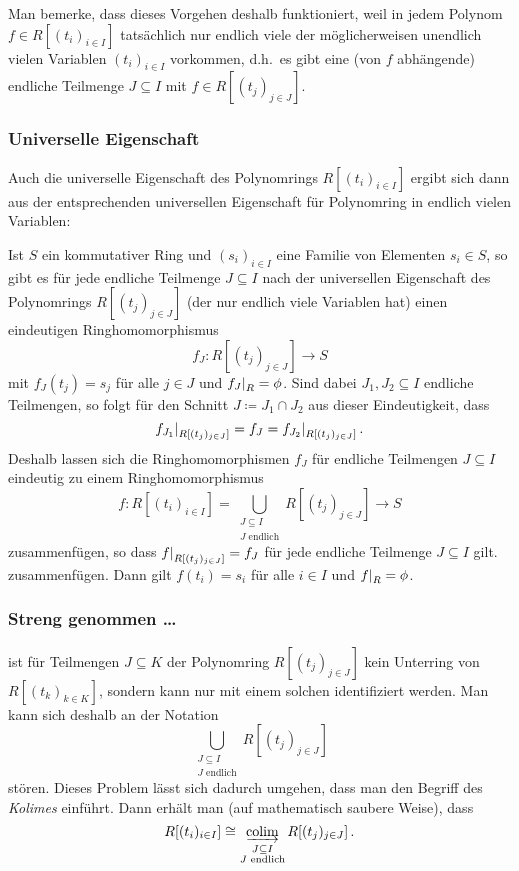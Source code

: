 Man bemerke, dass dieses Vorgehen deshalb funktioniert, weil in jedem Polynom $f \in R[(t_i)_{i \in I}]$ tatsächlich nur endlich viele der möglicherweisen unendlich vielen Variablen $(t_i)_{i \in I}$ vorkommen, d.h.\ es gibt eine (von $f$ abhängende) endliche Teilmenge $J \subseteq I$ mit $f \in R[(t_j)_{j \in J}]$.



\subsubsection*{Universelle Eigenschaft}

Auch die universelle Eigenschaft des Polynomrings $R[(t_i)_{i \in I}]$ ergibt sich dann aus der entsprechenden universellen Eigenschaft für Polynomring in endlich vielen Variablen:

Ist $S$ ein kommutativer Ring und $(s_i)_{i \in I}$ eine Familie von Elementen $s_i \in S$, so gibt es für jede endliche Teilmenge $J \subseteq I$ nach der universellen Eigenschaft des Polynomrings $R[(t_j)_{j \in J}]$ (der nur endlich viele Variablen hat) einen eindeutigen Ringhomomorphismus
\[
          f_J
  \colon  R[(t_j)_{j \in J}]
  \to     S
\]
mit $f_J(t_j) = s_j$ für alle $j \in J$ und $\restrict{f_J}{R} = \phi$.
Sind dabei $J_1, J_2 \subseteq I$ endliche Teilmengen, so folgt für den Schnitt $J \coloneqq J_1 \cap J_2$ aus dieser Eindeutigkeit, dass
\[
    \restrict{ f_{J_1} }{R[(t_j)_{j \in J}]}
  = f_{J}
  = \restrict{ f_{J_2} }{R[(t_j)_{j \in J}]} \,.
\]
Deshalb lassen sich die Ringhomomorphismen $f_J$ für endliche Teilmengen $J \subseteq I$ eindeutig zu einem Ringhomomorphismus
\[
          f
  \colon  R[(t_i)_{i \in I}]
  =       \bigcup_{\substack{J \subseteq I \\ \text{$J$ endlich}}} R[(t_j)_{j \in J}]
  \to     S
\]
zusammenfügen, so dass $\restrict{f}{R[(t_j)_{j \in J}]} = f_J$ für jede endliche Teilmenge $J \subseteq I$ gilt. zusammenfügen.
Dann gilt $f(t_i) = s_i$ für alle $i \in I$ und $\restrict{f}{R} = \phi$.



\subsubsection*{Streng genommen \dots}

ist für Teilmengen $J \subseteq K$ der Polynomring $R[(t_j)_{j \in J}]$ kein Unterring von $R[(t_k)_{k \in K}]$, sondern kann nur mit einem solchen identifiziert werden.
Man kann sich deshalb an der Notation
\[
  \bigcup_{\substack{J \subseteq I \\ \text{$J$ endlich}}} R[(t_j)_{j \in J}]
\]
stören.
Dieses Problem lässt sich dadurch umgehen, dass man den Begriff des \emph{Kolimes} einführt.
Dann erhält man (auf mathematisch saubere Weise), dass
\[
        R[(t_i)_{i \in I}]
  \cong \colim_{\substack{J \subseteq I \\ \text{$J$ endlich}}} R[(t_j)_{j \in J}] \,.
\]





